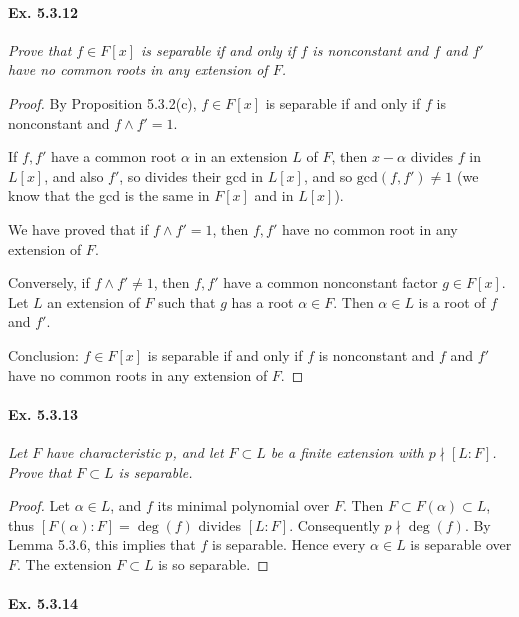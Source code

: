 \documentclass[11pt,a4paper]{article}
\begin{document}
\paragraph{Ex. 5.3.12}

{\it Prove that $f \in F[x]$ is separable if and only if $f$ is nonconstant and $f$ and $f'$ have no common roots in any extension of $F$.
}

\begin{proof}
By Proposition 5.3.2(c), $f \in F[x]$ is separable if and only if $f$ is nonconstant and  $f\wedge f' = 1$.

If $f, f'$ have a common root $\alpha$ in an extension  $L$ of $F$, then $x-\alpha$ divides $f$ in $L[x]$, and also $f'$, so divides their gcd in  $L[x]$, and so $\mathrm{gcd}(f,f') \ne 1$ (we know that the gcd is the same in $F[x]$ and in $L[x]$).

We have proved that if $f\wedge f' = 1$, then $f,f'$ have no common root in any extension of $F$.

Conversely, if $f \wedge f' \neq 1$, then $f,f'$ have a common nonconstant factor  $g \in F[x]$. 
Let $L$ an extension of $F$ such that  $g$ has a root $\alpha \in F$. Then $\alpha \in L$ is a root of $f$ and $f'$.

Conclusion: $f \in F[x]$ is separable if and only if $f$ is nonconstant and $f$ and $f'$ have no common roots in any extension of $F$.
\end{proof}

\paragraph{Ex. 5.3.13}

{\it Let $F$ have characteristic $p$, and let $F\subset L$ be a finite extension with $p \nmid [L:F]$. Prove that $F \subset L$ is separable.
}

\begin{proof}

Let $\alpha \in L$, and  $f$ its minimal polynomial over $F$. Then $F \subset F(\alpha) \subset L$, thus $[F(\alpha) : F] = \deg(f)$ divides $[L:F]$. Consequently $p \nmid \deg(f)$. By Lemma 5.3.6, this implies that $f$ is separable. Hence every $\alpha \in L$ is separable over $F$. The extension $F \subset L$ is so separable.
\end{proof}

\paragraph{Ex. 5.3.14}
\end{document}
